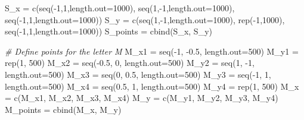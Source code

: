 \documentclass[
]{article}
\newenvironment{Shaded}{\begin{snugshade}}{\end{snugshade}}
\newcommand{\AttributeTok}[1]{\textcolor[rgb]{0.77,0.63,0.00}{#1}}
\newcommand{\CommentTok}[1]{\textcolor[rgb]{0.56,0.35,0.01}{\textit{#1}}}
\newcommand{\DecValTok}[1]{\textcolor[rgb]{0.00,0.00,0.81}{#1}}
\newcommand{\FloatTok}[1]{\textcolor[rgb]{0.00,0.00,0.81}{#1}}
\newcommand{\FunctionTok}[1]{\textcolor[rgb]{0.00,0.00,0.00}{#1}}
\newcommand{\NormalTok}[1]{#1}
\newcommand{\OtherTok}[1]{\textcolor[rgb]{0.56,0.35,0.01}{#1}}
\newcommand{\SpecialCharTok}[1]{\textcolor[rgb]{0.00,0.00,0.00}{#1}}
\begin{document}
\begin{Shaded}
\begin{Highlighting}[]
\NormalTok{S\_x }\OtherTok{=} \FunctionTok{c}\NormalTok{(}\FunctionTok{seq}\NormalTok{(}\SpecialCharTok{{-}}\DecValTok{1}\NormalTok{,}\DecValTok{1}\NormalTok{,}\AttributeTok{length.out=}\DecValTok{1000}\NormalTok{), }\FunctionTok{seq}\NormalTok{(}\DecValTok{1}\NormalTok{,}\SpecialCharTok{{-}}\DecValTok{1}\NormalTok{,}\AttributeTok{length.out=}\DecValTok{1000}\NormalTok{), }\FunctionTok{seq}\NormalTok{(}\SpecialCharTok{{-}}\DecValTok{1}\NormalTok{,}\DecValTok{1}\NormalTok{,}\AttributeTok{length.out=}\DecValTok{1000}\NormalTok{))}
\NormalTok{S\_y }\OtherTok{=} \FunctionTok{c}\NormalTok{(}\FunctionTok{seq}\NormalTok{(}\DecValTok{1}\NormalTok{,}\SpecialCharTok{{-}}\DecValTok{1}\NormalTok{,}\AttributeTok{length.out=}\DecValTok{1000}\NormalTok{), }\FunctionTok{rep}\NormalTok{(}\SpecialCharTok{{-}}\DecValTok{1}\NormalTok{,}\DecValTok{1000}\NormalTok{), }\FunctionTok{seq}\NormalTok{(}\SpecialCharTok{{-}}\DecValTok{1}\NormalTok{,}\DecValTok{1}\NormalTok{,}\AttributeTok{length.out=}\DecValTok{1000}\NormalTok{))}
\NormalTok{S\_points }\OtherTok{=} \FunctionTok{cbind}\NormalTok{(S\_x, S\_y)}

\CommentTok{\# Define points for the letter M}
\NormalTok{M\_x1 }\OtherTok{=} \FunctionTok{seq}\NormalTok{(}\SpecialCharTok{{-}}\DecValTok{1}\NormalTok{, }\SpecialCharTok{{-}}\FloatTok{0.5}\NormalTok{, }\AttributeTok{length.out=}\DecValTok{500}\NormalTok{)}
\NormalTok{M\_y1 }\OtherTok{=} \FunctionTok{rep}\NormalTok{(}\DecValTok{1}\NormalTok{, }\DecValTok{500}\NormalTok{)}
\NormalTok{M\_x2 }\OtherTok{=} \FunctionTok{seq}\NormalTok{(}\SpecialCharTok{{-}}\FloatTok{0.5}\NormalTok{, }\DecValTok{0}\NormalTok{, }\AttributeTok{length.out=}\DecValTok{500}\NormalTok{)}
\NormalTok{M\_y2 }\OtherTok{=} \FunctionTok{seq}\NormalTok{(}\DecValTok{1}\NormalTok{, }\SpecialCharTok{{-}}\DecValTok{1}\NormalTok{, }\AttributeTok{length.out=}\DecValTok{500}\NormalTok{)}
\NormalTok{M\_x3 }\OtherTok{=} \FunctionTok{seq}\NormalTok{(}\DecValTok{0}\NormalTok{, }\FloatTok{0.5}\NormalTok{, }\AttributeTok{length.out=}\DecValTok{500}\NormalTok{)}
\NormalTok{M\_y3 }\OtherTok{=} \FunctionTok{seq}\NormalTok{(}\SpecialCharTok{{-}}\DecValTok{1}\NormalTok{, }\DecValTok{1}\NormalTok{, }\AttributeTok{length.out=}\DecValTok{500}\NormalTok{)}
\NormalTok{M\_x4 }\OtherTok{=} \FunctionTok{seq}\NormalTok{(}\FloatTok{0.5}\NormalTok{, }\DecValTok{1}\NormalTok{, }\AttributeTok{length.out=}\DecValTok{500}\NormalTok{)}
\NormalTok{M\_y4 }\OtherTok{=} \FunctionTok{rep}\NormalTok{(}\DecValTok{1}\NormalTok{, }\DecValTok{500}\NormalTok{)}
\NormalTok{M\_x }\OtherTok{=} \FunctionTok{c}\NormalTok{(M\_x1, M\_x2, M\_x3, M\_x4)}
\NormalTok{M\_y }\OtherTok{=} \FunctionTok{c}\NormalTok{(M\_y1, M\_y2, M\_y3, M\_y4)}
\NormalTok{M\_points }\OtherTok{=} \FunctionTok{cbind}\NormalTok{(M\_x, M\_y)}


\end{Highlighting}
\end{Shaded}
\end{document}
